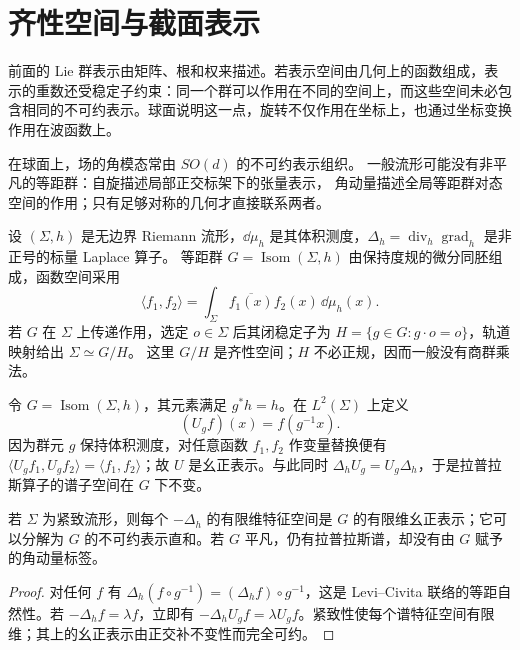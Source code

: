 \section{齐性空间与截面表示}
\label{sec:ghs-homogeneous-space}

前面的 Lie 群表示由矩阵、根和权来描述。若表示空间由几何上的函数组成，表示的重数还受稳定子约束：同一个群可以作用在不同的空间上，而这些空间未必包含相同的不可约表示。球面说明这一点，旋转不仅作用在坐标上，也通过坐标变换作用在波函数上。

在球面上，场的角模态常由 $SO(d)$ 的不可约表示组织。
一般流形可能没有非平凡的等距群：自旋描述局部正交标架下的张量表示，
角动量描述全局等距群对态空间的作用；只有足够对称的几何才直接联系两者。

\begin{definition}[等距群的函数表示与齐性空间]
设 $(\Sigma,h)$ 是无边界 Riemann 流形，$\dd\mu_h$ 是其体积测度，$\Delta_h=\operatorname{div}_h\operatorname{grad}_h$ 是非正号的标量 Laplace 算子。
等距群 $G=\operatorname{Isom}(\Sigma,h)$ 由保持度规的微分同胚组成，函数空间采用
\[
 \langle f_1,f_2\rangle=\int_\Sigma\overline{f_1(x)}f_2(x)\,\dd\mu_h(x).
\]
若 $G$ 在 $\Sigma$ 上传递作用，选定 $o\in\Sigma$ 后其闭稳定子为
$H=\{g\in G:g\cdot o=o\}$，轨道映射给出 $\Sigma\simeq G/H$。
这里 $G/H$ 是齐性空间；$H$ 不必正规，因而一般没有商群乘法。
\end{definition}

令 $G=\operatorname{Isom}(\Sigma,h)$，其元素满足 $g^*h=h$。在 $L^2(\Sigma)$ 上定义
\begin{equation}\label{eq:ghs-isometry-unitary}
 (U_gf)(x)=f(g^{-1}x).
\end{equation}
因为群元 $g$ 保持体积测度，对任意函数 $f_1,f_2$ 作变量替换便有
$\langle U_gf_1,U_gf_2\rangle=\langle f_1,f_2\rangle$；故 $U$ 是幺正表示。与此同时 $\Delta_hU_g=U_g\Delta_h$，于是拉普拉斯算子的谱子空间在 $G$ 下不变。

\begin{proposition}[几何对称性导致谱的表示分解]
\label{prop:ghs-laplacian-isometry}
若 $\Sigma$ 为紧致流形，则每个 $-\Delta_h$ 的有限维特征空间是 $G$ 的有限维幺正表示；它可以分解为 $G$ 的不可约表示直和。若 $G$ 平凡，仍有拉普拉斯谱，却没有由 $G$ 赋予的角动量标签。
\end{proposition}
\begin{proof}
对任何 $f$ 有 $\Delta_h(f\circ g^{-1})=(\Delta_hf)\circ g^{-1}$，这是 Levi--Civita 联络的等距自然性。若 $-\Delta_hf=\lambda f$，立即有 $-\Delta_hU_gf=\lambda U_gf$。紧致性使每个谱特征空间有限维；其上的幺正表示由正交补不变性而完全可约。
\end{proof}


